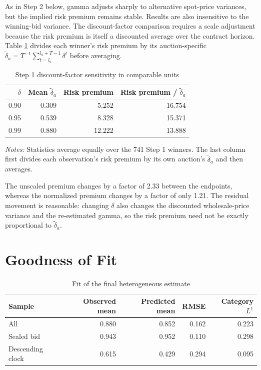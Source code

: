 \documentclass[10pt]{article}
\begin{document}
As in Step 2 below, gamma adjusts sharply to alternative spot-price variances,
but the implied risk premium remains stable. Results are also insensitive to
the winning-bid variance. The discount-factor comparison requires a scale
adjustment because the risk premium is itself a discounted average over the
contract horizon. Table \ref{tab:step1_delta_scaling} divides each winner's
risk premium by its auction-specific
$\widetilde\delta_a=T^{-1}\sum_{t=l_a}^{l_a+T-1}\delta^t$ before averaging.

\begin{table}[H]
\centering
\caption{Step 1 discount-factor sensitivity in comparable units}
\label{tab:step1_delta_scaling}
\begin{tabular}{rrrr}
\toprule
$\delta$ & Mean $\widetilde\delta_a$ & Risk premium
& Risk premium / $\widetilde\delta_a$\\
\midrule
0.90 & 0.309 & 5.252 & 16.754\\
0.95 & 0.539 & 8.328 & 15.371\\
0.99 & 0.880 & 12.222 & 13.888\\
\bottomrule
\end{tabular}
\begin{minipage}{0.92\textwidth}
\footnotesize
\textit{Notes:} Statistics average equally over the 741 Step 1 winners. The
last column first divides each observation's risk premium by its own auction's
$\widetilde\delta_a$ and then averages.
\end{minipage}
\end{table}

The unscaled premium changes by a factor of 2.33 between the endpoints, whereas
the normalized premium changes by a factor of only 1.21. The residual movement
is reasonable: changing $\delta$ also changes the discounted wholesale-price
variance and the re-estimated gamma, so the risk premium need not be exactly
proportional to $\widetilde\delta_a$.

\section{Goodness of Fit}

\begin{table}[H]
\centering
\caption{Fit of the final heterogeneous estimate}
\label{tab:gof}
\begin{tabular}{lrrrr}
\toprule
Sample & Observed mean & Predicted mean & RMSE & Category $L^1$\\
\midrule
All & 0.880 & 0.852 & 0.162 & 0.223\\
Sealed bid & 0.943 & 0.952 & 0.110 & 0.298\\
Descending clock & 0.615 & 0.429 & 0.294 & 0.095\\
\bottomrule
\end{tabular}
\end{table}
\end{document}
